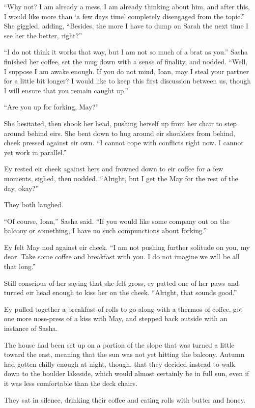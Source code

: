 ``Why not? I am already a mess, I am already thinking about him, and after this, I would like more than `a few days time' completely disengaged from the topic.'' She giggled, adding, ``Besides, the more I have to dump on Sarah the next time I see her the better, right?''

``I do not think it works that way, but I am not so much of a brat as you.'' Sasha finished her coffee, set the mug down with a sense of finality, and nodded. ``Well, I suppose I am awake enough. If you do not mind, Ioan, may I steal your partner for a little bit longer? I would like to keep this first discussion between us, though I will ensure that you remain caught up.''

``Are you up for forking, May?''

She hesitated, then shook her head, pushing herself up from her chair to step around behind eirs. She bent down to hug around eir shoulders from behind, cheek pressed against eir own. ``I cannot cope with conflicts right now. I cannot yet work in parallel.''

Ey rested eir cheek against hers and frowned down to eir coffee for a few moments, sighed, then nodded. ``Alright, but I get the May for the rest of the day, okay?''

They both laughed.

``Of course, Ioan,'' Sasha said. ``If you would like some company out on the balcony or something, I have no such compunctions about forking.''

Ey felt May nod against eir cheek. ``I am not pushing further solitude on you, my dear. Take some coffee and breakfast with you. I do not imagine we will be all that long.''

Still conscious of her saying that she felt gross, ey patted one of her paws and turned eir head enough to kiss her on the cheek. ``Alright, that sounds good.''

Ey pulled together a breakfast of rolls to go along with a thermos of coffee, got one more nose-press of a kiss with May, and stepped back outside with an instance of Sasha.

The house had been set up on a portion of the slope that was turned a little toward the east, meaning that the sun was not yet hitting the balcony. Autumn had gotten chilly enough at night, though, that they decided instead to walk down to the boulder lakeside, which would almost certainly be in full sun, even if it was less comfortable than the deck chairs.

They sat in silence, drinking their coffee and eating rolls with butter and honey.

